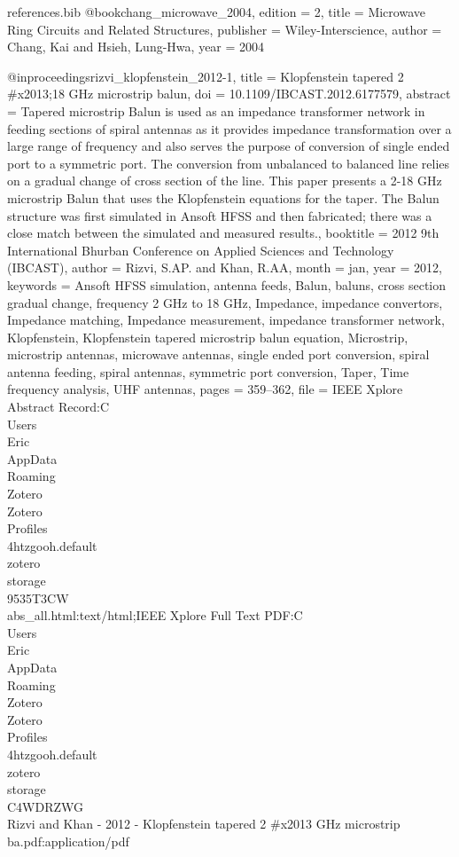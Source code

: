 \begin{filecontents*}{references.bib}
@book{chang_microwave_2004,
	edition = {2},
	title = {Microwave Ring Circuits and Related Structures},
	publisher = {Wiley-Interscience},
	author = {Chang, Kai and Hsieh, Lung-Hwa},
	year = {2004}
}

@inproceedings{rizvi_klopfenstein_2012-1,
	title = {Klopfenstein tapered 2 \#x2013;18 {GHz} microstrip balun},
	doi = {10.1109/IBCAST.2012.6177579},
	abstract = {Tapered microstrip Balun is used as an impedance transformer network in feeding sections of spiral antennas as it provides impedance transformation over a large range of frequency and also serves the purpose of conversion of single ended port to a symmetric port. The conversion from unbalanced to balanced line relies on a gradual change of cross section of the line. This paper presents a 2-18 {GHz} microstrip Balun that uses the Klopfenstein equations for the taper. The Balun structure was first simulated in Ansoft {HFSS} and then fabricated; there was a close match between the simulated and measured results.},
	booktitle = {2012 9th International Bhurban Conference on Applied Sciences and Technology ({IBCAST})},
	author = {Rizvi, S.AP. and Khan, R.AA},
	month = jan,
	year = {2012},
	keywords = {Ansoft {HFSS} simulation, antenna feeds, Balun, baluns, cross section gradual change, frequency 2 {GHz} to 18 {GHz}, Impedance, impedance convertors, Impedance matching, Impedance measurement, impedance transformer network, Klopfenstein, Klopfenstein tapered microstrip balun equation, Microstrip, microstrip antennas, microwave antennas, single ended port conversion, spiral antenna feeding, spiral antennas, symmetric port conversion, Taper, Time frequency analysis, {UHF} antennas},
	pages = {359--362},
	file = {IEEE Xplore Abstract Record:C\:\\Users\\Eric\\AppData\\Roaming\\Zotero\\Zotero\\Profiles\\4htzgooh.default\\zotero\\storage\\9535T3CW\\abs_all.html:text/html;IEEE Xplore Full Text PDF:C\:\\Users\\Eric\\AppData\\Roaming\\Zotero\\Zotero\\Profiles\\4htzgooh.default\\zotero\\storage\\C4WDRZWG\\Rizvi and Khan - 2012 - Klopfenstein tapered 2 #x2013 GHz microstrip ba.pdf:application/pdf}
}


\end{filecontents*}
